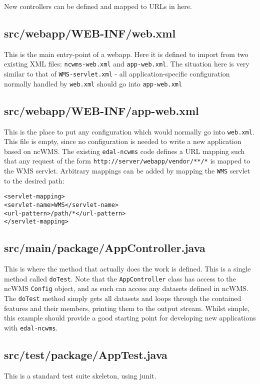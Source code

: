 \documentclass[a4paper]{article}
\begin{document}
New controllers can be defined and mapped to URLs in here.

\subsection{src/webapp/WEB-INF/web.xml}
This is the main entry-point of a webapp.  Here it is defined to import from two
existing XML files: {\tt ncwms-web.xml} and {\tt app-web.xml}.  The situation
here is very similar to that of {\tt WMS-servlet.xml} - all
application-specific configuration normally handled by {\tt web.xml} should go
into {\tt app-web.xml}

\subsection{src/webapp/WEB-INF/app-web.xml}
This is the place to put any configuration which would normally go into
{\tt web.xml}.  This file is empty, since no configuration is needed to write a
new application based on ncWMS.  The existing {\tt edal-ncwms} code defines a
URL mapping such that any request of the form
{\tt http://server/webapp/vendor/**/*} is mapped to the WMS servlet.  Arbitrary
mappings can be added by mapping the {\tt WMS} servlet to the desired path: 
\begin{alltt}
<servlet-mapping>
    <servlet-name>WMS</servlet-name>
    <url-pattern>/path/*</url-pattern>
</servlet-mapping>
\end{alltt}

\subsection{src/main/package/AppController.java}
This is where the method that actually does the work is defined.  This is a
single method called {\tt doTest}.  Note that the {\tt AppController} class has
access to the ncWMS {\tt Config} object, and as such can access any datasets
defined in ncWMS.  The {\tt doTest} method simply gets all datasets and loops
through the contained features and their members, printing them to the output
stream.  Whilst simple, this example should provide a good starting point for
developing new applications with {\tt edal-ncwms}.

\subsection{src/test/package/AppTest.java}
This is a standard test suite skeleton, using junit. 
\end{document}
